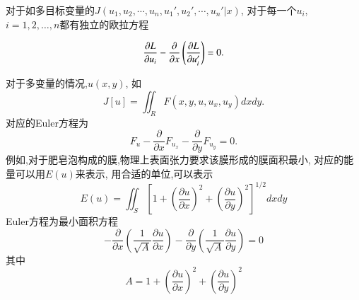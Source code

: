 对于如多目标变量的$J(u_1, u_2, \cdots, u_n, u_1', u_2', \cdots, u_n'|x)$, 对于每一个$u_i$, $i=1,2,\dots,n$都有独立的欧拉方程

\begin{equation}
  \frac{\partial{L}}{\partial{u_i}} -  \frac{\partial{}}{\partial{x}}\left( \frac{\partial{L}}{\partial{u'_i}} \right) = 0 .
\end{equation}

对于多变量的情况,$u(x,y)$, 如
\begin{equation}
J[u]=\iint_R F\left(x, y, u, u_x, u_y\right) d x d y .
\end{equation}
对应的Euler方程为
\begin{equation}
F_u-\frac{\partial}{\partial x} F_{u_x}-\frac{\partial}{\partial y} F_{u_y}=0.
\end{equation}
例如,对于肥皂泡构成的膜,物理上表面张力要求该膜形成的膜面积最小, 对应的能量可以用$E(u)$来表示,
用合适的单位,可以表示
$$
E(u)=\iint_S\left[1+\left(\frac{\partial u}{\partial x}\right)^2+\left(\frac{\partial u}{\partial y}\right)^2\right]^{1 / 2} d x d y
$$
Euler方程为最小面积方程
$$
-\frac{\partial}{\partial x}\left(\frac{1}{\sqrt{A}} \frac{\partial u}{\partial x}\right)-\frac{\partial}{\partial y}\left(\frac{1}{\sqrt{A}} \frac{\partial u}{\partial y}\right)=0
$$
其中
$$
A=1+\left(\frac{\partial u}{\partial x}\right)^2+\left(\frac{\partial u}{\partial y}\right)^2
$$







